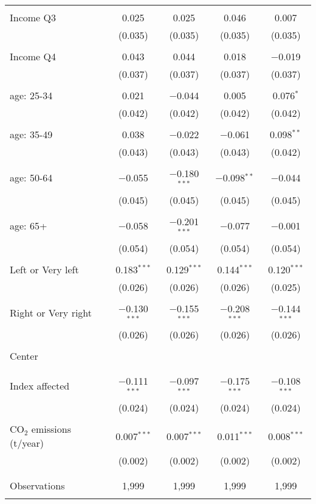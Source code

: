 \begin{tabular}{@{\extracolsep{5pt}}lcccc}
  & & & & \\ 
 Income Q3 & 0.025 & 0.025 & 0.046 & 0.007 \\ 
  & (0.035) & (0.035) & (0.035) & (0.035) \\ 
  & & & & \\ 
 Income Q4 & 0.043 & 0.044 & 0.018 & $-$0.019 \\ 
  & (0.037) & (0.037) & (0.037) & (0.037) \\ 
  & & & & \\ 
 age: 25-34 & 0.021 & $-$0.044 & 0.005 & 0.076$^{*}$ \\ 
  & (0.042) & (0.042) & (0.042) & (0.042) \\ 
  & & & & \\ 
 age: 35-49 & 0.038 & $-$0.022 & $-$0.061 & 0.098$^{**}$ \\ 
  & (0.043) & (0.043) & (0.043) & (0.042) \\ 
  & & & & \\ 
 age: 50-64 & $-$0.055 & $-$0.180$^{***}$ & $-$0.098$^{**}$ & $-$0.044 \\ 
  & (0.045) & (0.045) & (0.045) & (0.045) \\ 
  & & & & \\ 
 age: 65+ & $-$0.058 & $-$0.201$^{***}$ & $-$0.077 & $-$0.001 \\ 
  & (0.054) & (0.054) & (0.054) & (0.054) \\ 
  & & & & \\ 
 Left or Very left & 0.183$^{***}$ & 0.129$^{***}$ & 0.144$^{***}$ & 0.120$^{***}$ \\ 
  & (0.026) & (0.026) & (0.026) & (0.025) \\ 
  & & & & \\ 
 Right or Very right & $-$0.130$^{***}$ & $-$0.155$^{***}$ & $-$0.208$^{***}$ & $-$0.144$^{***}$ \\ 
  & (0.026) & (0.026) & (0.026) & (0.026) \\ 
  & & & & \\ 
 Center &  &  &  &  \\ 
  &  &  &  &  \\ 
  & & & & \\ 
 Index affected & $-$0.111$^{***}$ & $-$0.097$^{***}$ & $-$0.175$^{***}$ & $-$0.108$^{***}$ \\ 
  & (0.024) & (0.024) & (0.024) & (0.024) \\ 
  & & & & \\ 
 CO$_{2}$ emissions (t/year) & 0.007$^{***}$ & 0.007$^{***}$ & 0.011$^{***}$ & 0.008$^{***}$ \\ 
  & (0.002) & (0.002) & (0.002) & (0.002) \\ 
  & & & & \\ 
\hline \\[-1.8ex] 

Observations & 1,999 & 1,999 & 1,999 & 1,999 \\ 
\hline 
\hline \\[-1.8ex] 
\end{tabular} 